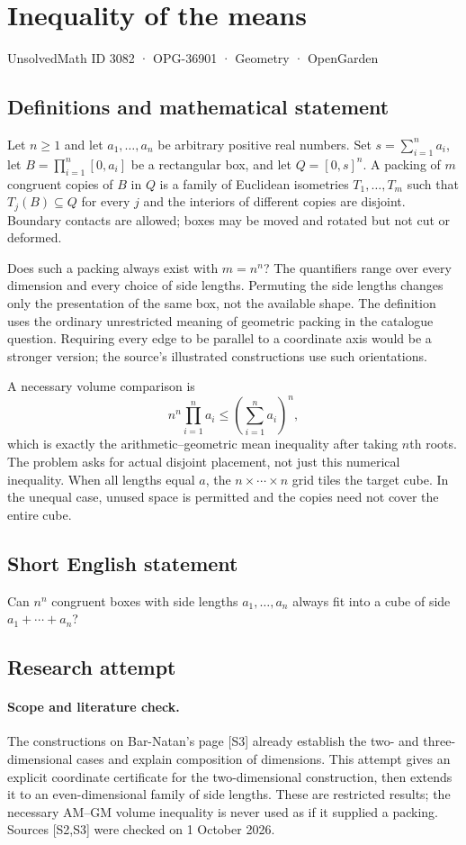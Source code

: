\documentclass[11pt,a4paper]{article}
\begin{document}
\section*{Inequality of the means}\label{3082}
{\small UnsolvedMath ID 3082 · OPG-36901 · Geometry · OpenGarden}
\subsection{Definitions and mathematical statement}
Let $n\ge1$ and let $a_1,\ldots,a_n$ be arbitrary positive real numbers.
Set $s=\sum_{i=1}^n a_i$, let
$B=\prod_{i=1}^n[0,a_i]$ be a rectangular box, and let $Q=[0,s]^n$.
A packing of $m$ congruent copies of $B$ in $Q$ is a family of Euclidean
isometries $T_1,\ldots,T_m$ such that $T_j(B)\subseteq Q$ for every $j$
and the interiors of different copies are disjoint. Boundary contacts
are allowed; boxes may be moved and rotated but not cut or deformed.

Does such a packing always exist with $m=n^n$? The quantifiers range
over every dimension and every choice of side lengths. Permuting the
side lengths changes only the presentation of the same box, not the
available shape. The definition uses the ordinary unrestricted meaning
of geometric packing in the catalogue question. Requiring every edge to
be parallel to a coordinate axis would be a stronger version; the source's
illustrated constructions use such orientations.

A necessary volume comparison is
\[
 n^n\prod_{i=1}^n a_i\le\left(\sum_{i=1}^n a_i\right)^n,
\]
which is exactly the arithmetic--geometric mean inequality after taking
$n$th roots. The problem asks for actual disjoint placement, not just this
numerical inequality. When all lengths equal $a$, the $n\times\cdots\times n$
grid tiles the target cube. In the unequal case, unused space is permitted
and the copies need not cover the entire cube.
\subsection{Short English statement}
Can $n^n$ congruent boxes with side lengths $a_1,\ldots,a_n$ always fit into a cube of side $a_1+\cdots+a_n$?
\subsection{Research attempt}
\paragraph{Scope and literature check.}
The constructions on Bar-Natan's page [S3] already establish the two- and
three-dimensional cases and explain composition of dimensions. This attempt
gives an explicit coordinate certificate for the two-dimensional construction,
then extends it to an even-dimensional family of side lengths. These are
restricted results; the necessary AM--GM volume inequality is never used as
if it supplied a packing. Sources [S2,S3] were checked on 1 October 2026.
\end{document}
